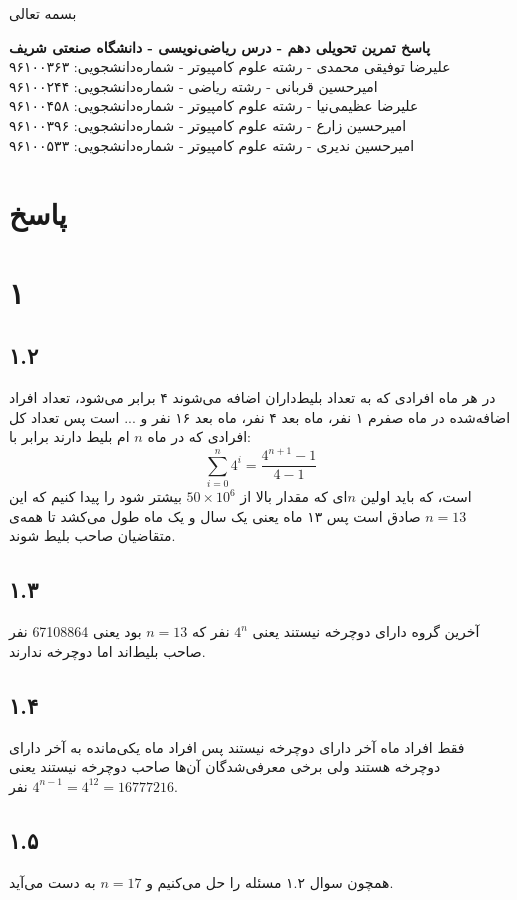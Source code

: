 \documentclass[12pt,a4paper]{article}
\begin{document}
\begin{center}
	بسمه تعالی
\end{center}
\begin{center}
	\textbf{پاسخ تمرین تحویلی دهم - درس ریاضی‌نویسی - دانشگاه صنعتی شریف}
	\\
	علیرضا توفیقی محمدی - رشته علوم کامپیوتر - شماره‌دانشجویی: ۹۶۱۰۰۳۶۳
	\\
	امیرحسین قربانی - رشته ریاضی - شماره‌دانشجویی: ۹۶۱۰۰۲۴۴
	\\
	علیرضا عظیمی‌نیا - رشته علوم کامپیوتر - شماره‌دانشجویی: ۹۶۱۰۰۴۵۸
	\\
	امیرحسین زارع - رشته علوم کامپیوتر - شماره‌دانشجویی: ۹۶۱۰۰۳۹۶
	\\
	امیرحسین ندیری - رشته علوم کامپیوتر - شماره‌دانشجویی: ۹۶۱۰۰۵۳۳
\end{center}

\section*{پاسخ}
\section*{۱}
\subsection*{۱.۲}
در هر ماه افرادی که به تعداد بلیط‌داران اضافه می‌شوند ۴ برابر می‌شود، تعداد افراد اضافه‌شده در ماه صفرم ۱ نفر، ماه بعد ۴ نفر، ماه بعد ۱۶ نفر و ... است پس تعداد کل افرادی که در ماه $n$ ام بلیط دارند برابر با:
$$
\sum_{i = 0}^n 4^i = \frac{4^{n+1}-1}{4-1}
$$
است، که باید اولین $n$ای که مقدار بالا از 
$50\times 10^6$
بیشتر شود را پیدا کنیم که این $n = 13$ صادق است پس ۱۳ ماه یعنی یک سال و یک ماه طول می‌کشد تا همه‌ی متقاضیان صاحب بلیط شوند.
\subsection*{۱.۳}
آخرین گروه دارای دوچرخه نیستند یعنی $4^{n}$ نفر که $n=13$ بود یعنی 
67108864 
نفر صاحب بلیط‌اند اما دوچرخه ندارند.
\subsection*{۱.۴}
فقط افراد ماه آخر دارای دوچرخه نیستند پس افراد ماه یکی‌مانده به آخر دارای دوچرخه هستند ولی برخی معرفی‌شدگان آن‌ها صاحب دوچرخه نیستند یعنی
$4^{n-1} = 4^{12} = 16777216$
نفر.
\subsection*{۱.۵}
همچون سوال ۱.۲ مسئله را حل می‌کنیم و 
$n = 17$
به دست می‌آید.
\end{document}
